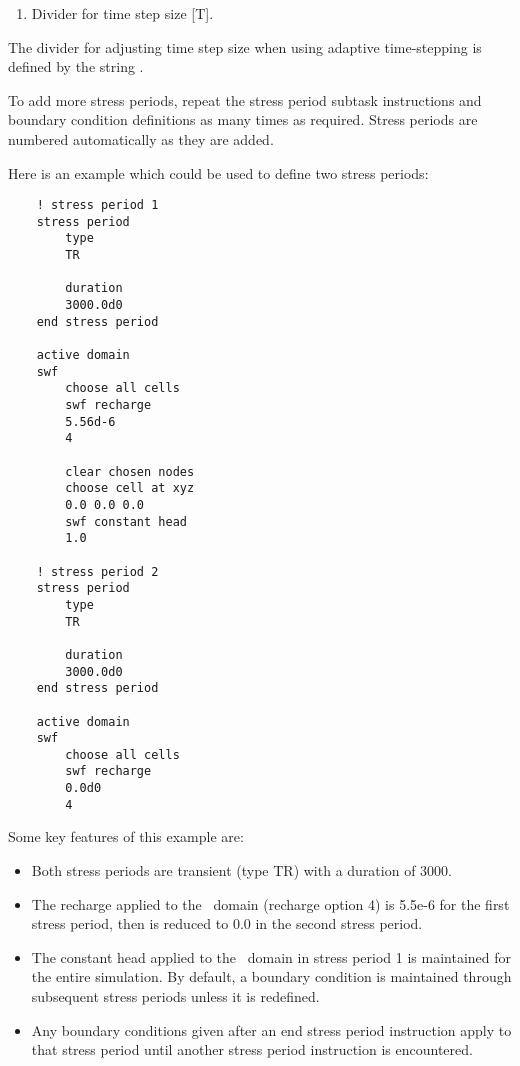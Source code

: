     {
        \squish
        \begin{enumerate}
        \item {}  Divider for time step size [T].
        \end{enumerate}
        The divider for adjusting time step size when using adaptive time-stepping is defined by the string .
    }
    
To add more stress periods, repeat the \textsf{stress period} subtask instructions and boundary condition definitions as many times as required.  Stress periods are numbered automatically as they are added.

\pagebreak
Here is an example which could be used to define two stress periods:
\begin{verbatim}
    ! stress period 1
    stress period
        type
        TR

        duration
        3000.0d0
    end stress period

    active domain
    swf
        choose all cells
        swf recharge
        5.56d-6
        4
        
        clear chosen nodes
        choose cell at xyz
        0.0 0.0 0.0 
        swf constant head
        1.0

    ! stress period 2
    stress period
        type
        TR

        duration
        3000.0d0
    end stress period

    active domain
    swf
        choose all cells
        swf recharge
        0.0d0
        4
\end{verbatim}

Some key features of this example are:
\begin{itemize}
    \item Both stress periods are transient (type TR) with a duration of 3000.
    \item The recharge applied to the \swf\ domain (recharge option 4) is 5.5e-6 for the first stress period, then is reduced to 0.0 in the second stress period.
    \item The constant head applied to the \swf\ domain in stress period 1 is maintained for the entire simulation.  By default, a boundary condition is maintained through subsequent stress periods unless it is redefined.
    \item Any boundary conditions given after an \textsf{end stress period} instruction apply to that stress period until another \textsf{stress period} instruction is encountered.
\end{itemize}


    

